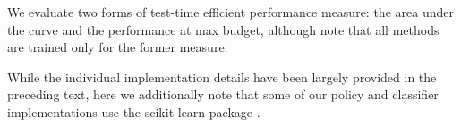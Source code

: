 We evaluate two forms of test-time efficient performance measure: the area under the curve and the performance at max budget, although note that all methods are trained only for the former measure.

While the individual implementation details have been largely provided in the preceding text, here we additionally note that some of our policy and classifier implementations use the scikit-learn package \parencite{Pedregosa2011}.





